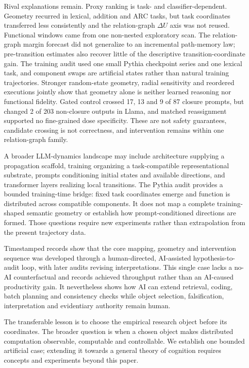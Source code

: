 \documentclass[11pt]{article}
\begin{document}
Rival explanations remain. Proxy ranking is task- and classifier-dependent. Geometry recurred in lexical, addition and ARC tasks, but task coordinates transferred less consistently and the relation-graph $\Delta U$ axis was not reused. Functional windows came from one non-nested exploratory scan. The relation-graph margin forecast did not generalize to an incremental path-memory law; pre-transition estimates also recover little of the descriptive transition-coordinate gain. The training audit used one small Pythia checkpoint series and one lexical task, and component swaps are artificial states rather than natural training trajectories. Stronger random-state geometry, radial sensitivity and reordered executions jointly show that geometry alone is neither learned reasoning nor functional fidelity. Gated control crossed 17, 13 and 9 of 87 closure prompts, but changed 2 of 203 non-closure outputs in Llama, and matched reassignment supported no fine-grained dose specificity. These are not safety guarantees, candidate crossing is not correctness, and intervention remains within one relation-graph family.

A broader LLM-dynamics landscape may include architecture supplying a propagation scaffold, training organizing a task-compatible representational substrate, prompts conditioning initial states and available directions, and transformer layers realizing local transitions. The Pythia audit provides a bounded training-time bridge: fixed task coordinates emerge and function is distributed across compatible components. It does not map a complete training-shaped semantic geometry or establish how prompt-conditioned directions are formed. Those questions require new experiments rather than extrapolation from the present trajectory data.

Timestamped records show that the core mapping, geometry and intervention sequence was developed through a human-directed, AI-assisted hypothesis-to-audit loop, with later audits revising interpretations. This single case lacks a no-AI counterfactual and records achieved throughput rather than an AI-caused productivity gain. It nevertheless shows how AI can extend retrieval, coding, batch planning and consistency checks while object selection, falsification, interpretation and evidentiary authority remain human.

The transferable lesson is to choose the empirical research object before its coordinates. The broader question is when a chosen object makes distributed computation observable, computable and controllable. We establish one bounded artificial case; extending it towards a general theory of cognition requires concepts and experiments beyond this paper.
\end{document}
